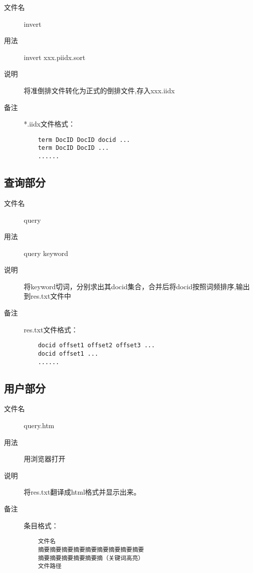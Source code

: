 \documentclass[14pt,a4paper]{article}
\begin{document}
\begin{description}
\item[文件名] invert
\item[用法] invert xxx.piidx.sort
\item[说明] 将准倒排文件转化为正式的倒排文件,存入xxx.iidx
\item[备注] *.iidx文件格式：\\
  \begin{lstlisting}
    term DocID DocID docid ...
    term DocID DocID ...
    ......
  \end{lstlisting}
\end{description}
\subsection{查询部分}
\begin{description}
\item[文件名] query
\item[用法] query keyword
\item[说明] 将keyword切词，分别求出其docid集合，合并后将docid按照词频排序,输出到res.txt文件中
\item[备注] res.txt文件格式：\\
  \begin{lstlisting}
    docid offset1 offset2 offset3 ...
    docid offset1 ...
    ......
  \end{lstlisting}
\end{description}
\subsection{用户部分}
\begin{description}
\item[文件名] query.htm
\item[用法] 用浏览器打开
\item[说明] 将res.txt翻译成html格式并显示出来。
\item[备注] 条目格式：\\
  \begin{verbatim}
    文件名    
    摘要摘要摘要摘要摘要摘要摘要摘要摘要
    摘要摘要摘要摘要摘要摘（关键词高亮）    
    文件路径
  \end{verbatim}
\end{description}
\end{document}
